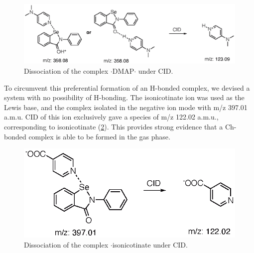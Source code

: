 \begin{refsection}
\begin{figure}
    \centering
    \includegraphics[scale=0.74]{Figures/pos-esi-ms.eps}
    \caption[Positive mode ESI of $\cdot$DMAP$\cdot$]{Dissociation of the complex $\cdot$DMAP$\cdot$ under CID.}
    \label{fig:pos-esi-ms}
\end{figure}

To circumvent this preferential formation of an H-bonded complex, we devised a system with no possibility of H-bonding.
The isonicotinate ion was used as the Lewis base, and the complex isolated in the negative ion mode with m/z 397.01 a.m.u.
CID of this ion exclusively gave a species of m/z 122.02 a.m.u., corresponding to isonicotinate (\cref{fig:neg-esi-ms}).
This provides strong evidence that a Ch-bonded complex is able to be formed in the gas phase.

\begin{figure}
    \centering
    \includegraphics[scale=0.74]{Figures/neg-esi-ms.eps}
    \caption[Negative mode ESI of $\cdot$isonicotinate]{Dissociation of the complex $\cdot$isonicotinate under CID.}
    \label{fig:neg-esi-ms}
\end{figure}


\end{refsection}
